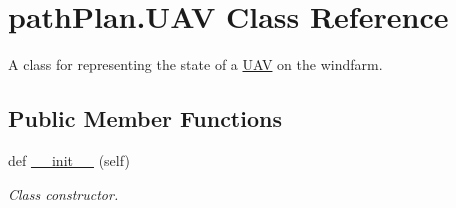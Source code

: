 \hypertarget{classpath_plan_1_1_u_a_v}{}\section{path\+Plan.\+U\+AV Class Reference}
\label{classpath_plan_1_1_u_a_v}


A class for representing the state of a \mbox{\hyperlink{classpath_plan_1_1_u_a_v}{U\+AV}} on the windfarm.  


\subsection*{Public Member Functions}
\begin{DoxyCompactItemize}
\item 
def \mbox{\hyperlink{classpath_plan_1_1_u_a_v_a57ea529b1f8160c59ac6d3ba1b677c37}{\+\_\+\+\_\+init\+\_\+\+\_\+}} (self)
\begin{DoxyCompactList}\small\item\em Class constructor. \end{DoxyCompactList}\end{DoxyCompactItemize}
